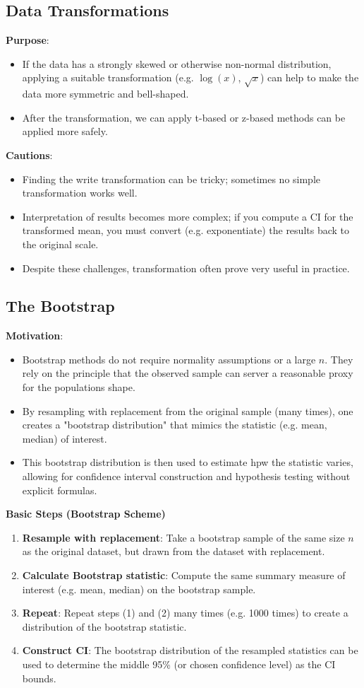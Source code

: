 \documentclass[10pt]{extarticle}
\begin{document}
\subsection{Data Transformations}
\textbf{Purpose}:
\begin{itemize}
    \item If the data has a strongly skewed or otherwise non-normal distribution, applying a suitable transformation (e.g. $\log(x)$, $\sqrt{x}$) can help to make the data more symmetric and bell-shaped.
    \item After the transformation, we can apply t-based or z-based methods can be applied more safely.
\end{itemize}
\textbf{Cautions}:
\begin{itemize}
    \item Finding the write transformation can be tricky; sometimes no simple transformation works well.
    \item Interpretation of results becomes more complex; if you compute a CI for the transformed mean, you must convert (e.g. exponentiate) the results back to the original scale.
    \item Despite these challenges, transformation often prove very useful in practice.
\end{itemize} 

\subsection{The Bootstrap}
\textbf{Motivation}:
\begin{itemize}
    \item Bootstrap methods do not require normality assumptions or a large $n$. They rely on the principle that the observed sample can server a reasonable proxy for the populations shape. 
    \item By resampling with replacement from the original sample (many times), one creates a "bootstrap distribution" that mimics the statistic (e.g. mean, median) of interest.
    \item This bootstrap distribution is then used to estimate hpw the statistic varies, allowing for confidence interval construction and hypothesis testing without explicit formulas.
\end{itemize}
\textbf{Basic Steps (Bootstrap Scheme)}
\begin{enumerate}
    \item \textbf{Resample with replacement}: Take a bootstrap sample of the same size $n$ as the original dataset, but drawn from the dataset with replacement.
    \item \textbf{Calculate Bootstrap statistic}: Compute the same summary measure of interest (e.g. mean, median) on the bootstrap sample.
    \item \textbf{Repeat}: Repeat steps (1) and (2) many times (e.g. 1000 times) to create a distribution of the bootstrap statistic.
    \item \textbf{Construct CI}: The bootstrap distribution of the resampled statistics can be used to determine the middle 95\% (or chosen confidence level) as the CI bounds.
\end{enumerate}
\end{document}
